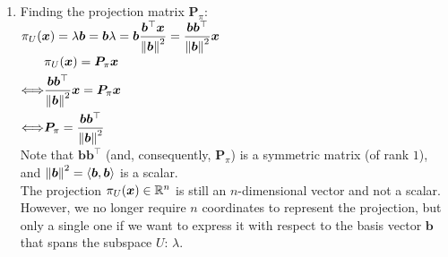 \begin{enumerate}
\begin{enumerate}
        \item Finding the projection matrix $\bm{P}_\pi$:
        \hfill \cite{mfml/book/mml/Deisenroth-Faisal-Ong}
        \\
        $
            \pi _U (\bm{x})
            = \lambda \bm{b}
            = \bm{b} \lambda
            = \bm{b} \dfrac{\bm{b}^\top \bm{x}}{\left\| \bm{b} \right\|^2}
            = \dfrac{\bm{b}  \bm{b}^\top }{\left\| \bm{b} \right\|^2} \bm{x}
        $
        \\
        $
            \begin{aligned}
                & \pi _U (\bm{x}) = \bm{P}_\pi \bm{x}
                \\
                \Longleftrightarrow &
                \dfrac{\bm{b}  \bm{b}^\top }{\left\| \bm{b} \right\|^2} \bm{x} = \bm{P}_\pi \bm{x}
                \\
                \Longleftrightarrow &
                \bm{P}_\pi = \dfrac{\bm{b}  \bm{b}^\top }{\left\| \bm{b} \right\|^2}
            \end{aligned}
        $
        \\[0.2cm]
        Note that $\bm{bb}^\top$ (and, consequently, $\bm{P} _\pi$) is a symmetric matrix (of rank $1$), and $\left\| \bm{b} \right\| ^2 = \langle\bm{b}, \bm{b}\rangle$ is a scalar.\\
        The projection $\pi_U (\bm{x}) \in \mathbb{R}^n$ is still an $n$-dimensional vector and not a scalar.
        However, we no longer require $n$ coordinates to represent the projection, but only a single one if we want to express it with respect to the basis vector $\bm{b}$ that spans the subspace $U$: $\lambda$.
        \hfill \cite{mfml/book/mml/Deisenroth-Faisal-Ong}
    \end{enumerate}
\end{enumerate}



